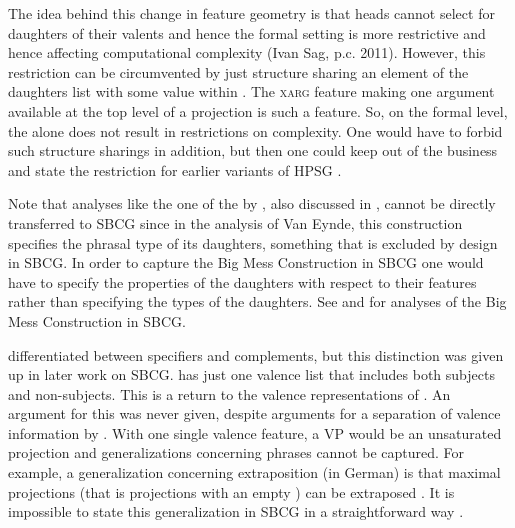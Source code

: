 \documentclass[output=paper
	        ,collection
	        ,collectionchapter
 	        ,biblatex
                ,babelshorthands
                ,newtxmath
                ,draftmode
                ,colorlinks, citecolor=brown
]{langscibook}
\begin{document}
\z
The idea behind this change in feature geometry is that heads cannot select for daughters of their valents and hence
the formal setting is more restrictive and hence affecting computational complexity (Ivan Sag,
p.c. 2011). However, this restriction can be circumvented by just structure sharing an element of
the daughters list with some value within \mother. The \textsc{xarg} feature making one argument
available at the top level of a projection \citep{BF99a} is such a feature. So, on the formal level, the \motherf alone does not
result in restrictions on complexity. One would have to forbid such structure sharings in addition,
but then one could keep \mother out of the business and state the restriction for earlier variants
of HPSG \citep[Section~10.6.2.1.3]{MuellerGT-Eng2}.

Note that analyses like the one of the  by \citet[]{VanEynde2018a-u}, also discussed in
\crossrefchapterw[\page \pageref{bigmess2}]{np}, cannot be directly transferred to SBCG since in the
analysis of Van Eynde, this construction specifies the phrasal type of its daughters, something that
is excluded by design in SBCG. In order to capture the Big Mess Construction in SBCG one would have
to specify the properties of the daughters with respect to their features rather than specifying the
types of the daughters. See \citet{KS2012a-u} and \citet{KS2011a-u} for analyses of the Big Mess Construction in SBCG.


\citet{SWB2003a} differentiated between specifiers and complements, but this distinction was given up
in later work on SBCG. \citet{Sag2012a} has just one valence list that includes both subjects and
non-subjects. This is a return to the valence representations of \citet{ps}. An argument for this
was never given, despite arguments for a separation of valence information by \citet{Borsley87a}. With one single valence feature, a VP would be an unsaturated projection and generalizations
concerning phrases cannot be captured. For example, a generalization concerning extraposition (in
German) is that maximal projections (that is projections with an empty \compsl) can be
extraposed \citep[Section~13.1.2]{Mueller99a}. It is impossible to state this generalization in SBCG
in a straightforward way \citep[Section~10.6.2.3]{MuellerGT-Eng2}.

\end{document}
